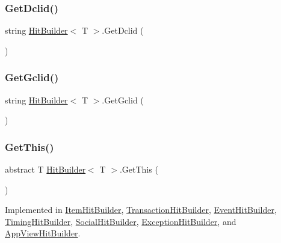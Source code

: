 \subsubsection{\texorpdfstring{Get\+Dclid()}{GetDclid()}}
{\footnotesize\ttfamily string \hyperlink{class_hit_builder}{Hit\+Builder}$<$ T $>$.Get\+Dclid (\begin{DoxyParamCaption}{ }\end{DoxyParamCaption})}

\mbox{\label{class_hit_builder_aed45644b41067f6c82655f127b4edd8e}} 
\subsubsection{\texorpdfstring{Get\+Gclid()}{GetGclid()}}
{\footnotesize\ttfamily string \hyperlink{class_hit_builder}{Hit\+Builder}$<$ T $>$.Get\+Gclid (\begin{DoxyParamCaption}{ }\end{DoxyParamCaption})}

\mbox{\label{class_hit_builder_a4276c57427406e264dc33f8c900ad530}} 
\subsubsection{\texorpdfstring{Get\+This()}{GetThis()}}
{\footnotesize\ttfamily abstract T \hyperlink{class_hit_builder}{Hit\+Builder}$<$ T $>$.Get\+This (\begin{DoxyParamCaption}{ }\end{DoxyParamCaption})\hspace{0.3cm}{\ttfamily [pure virtual]}}



Implemented in \hyperlink{class_item_hit_builder_a1e4bf966bf09e948db5d5eef3f56358f}{Item\+Hit\+Builder}, \hyperlink{class_transaction_hit_builder_a6d3d242ed5f10c7801a8e2ce8aac8ba9}{Transaction\+Hit\+Builder}, \hyperlink{class_event_hit_builder_a0eade8be0a38bfbdaa0f2d0c3dec59ee}{Event\+Hit\+Builder}, \hyperlink{class_timing_hit_builder_a2a40227ad34afd876afb06c316d5d00a}{Timing\+Hit\+Builder}, \hyperlink{class_social_hit_builder_a6c7d040e21d2c01a4d532ca4bd7d1221}{Social\+Hit\+Builder}, \hyperlink{class_exception_hit_builder_ab26ba8fde304bcae22d2eab95f319677}{Exception\+Hit\+Builder}, and \hyperlink{class_app_view_hit_builder_a3480e5a885a822459f34498cdf62ca03}{App\+View\+Hit\+Builder}.

